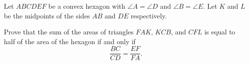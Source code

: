 \documentclass[varwidth]{standalone}
\begin{document}
    Let $ABCDEF$ be a convex hexagon with $\angle A = \angle D$ and $\angle B = \angle E$. Let $K$ and $L$ be the midpoints of the sides $AB$ and $DE$ respectively.

    Prove that the sum of the areas of triangles $FAK$, $KCB$, and $CFL$ is equal to half of the area of the hexagon if and only if
    \[
        \frac{BC}{CD} = \frac{EF}{FA}.  
    \]
\end{document}
